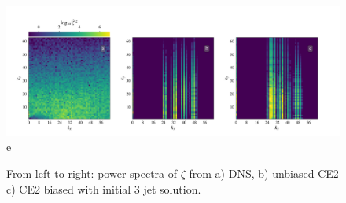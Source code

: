 \documentclass{jfm}
\begin{document}
\begin{figure}
  \centering
  \includegraphics[width=\textwidth]{../../figs/power_spectra_zeta_dns_run_R.pdf}
e  \caption{From left to right: power spectra of $\zeta$ from a) DNS, b) unbiased CE2 c) CE2 biased with initial 3 jet solution.}
  \label{fig:power_spec_S}
\end{figure}
\end{document}
